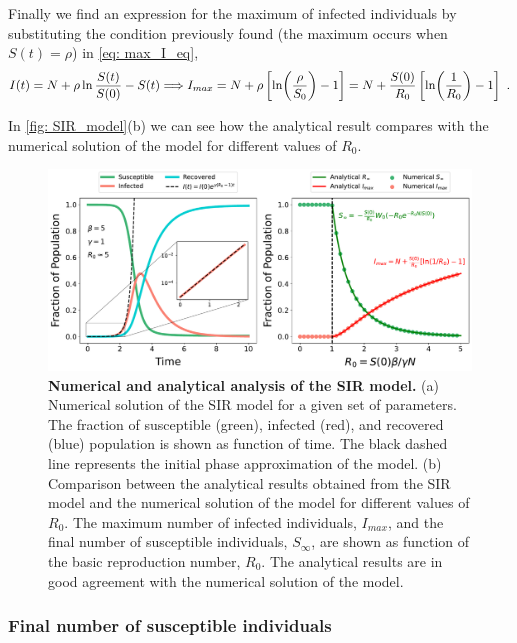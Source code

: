 Finally we find an expression for the maximum of infected individuals by
substituting the condition previously found (the maximum occurs when
$S(t)=\rho$)
in \cref{eq:  max_I_eq},
\begin{equation}
  I(t)=N+\rho\ln{\frac{S(t)}{S(0)}}-S(t) \Longrightarrow
  I_{max}=N+\rho\claudator{\ln(\frac{\rho}{S_0}) -
    1}=N+\frac{S(0)}{R_0}\claudator{\ln(\frac{1}{R_0}) - 1} \ .
\end{equation}

In \cref{fig: SIR_model}(b) we can see how the analytical result compares with
the numerical solution of the model for different values of $R_0$.

\begin{figure}[H]
  \centering
  \includegraphics[width=1\textwidth]{Figures/SIR_model_analysis.pdf}
  \caption[Numerical and analytical analysis of the SIR model.]{\label{fig:
      SIR_model} \textbf{Numerical and analytical analysis of the SIR model.}
    (a) Numerical solution of the SIR model for a given set of parameters. The
    fraction of susceptible (green), infected (red), and recovered (blue)
    population is shown as function of time. The black dashed line represents
    the initial phase approximation of the model. (b) Comparison between the
    analytical results obtained from the SIR model and the numerical solution
    of the model for different values of $R_0$. The maximum number of infected
    individuals, $I_{max}$, and the final number of susceptible individuals,
    $S_{\infty}$, are shown as function of the basic reproduction number,
    $R_0$. The analytical results are in good agreement with the numerical
    solution of the model.
  }
\end{figure}

\subsubsection*{Final number of susceptible individuals}

